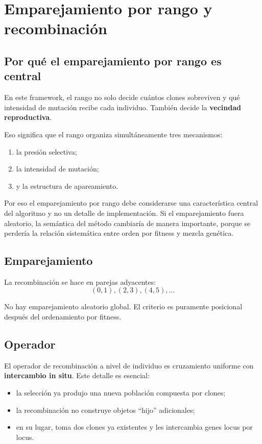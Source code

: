 \documentclass[11pt]{article}
\begin{document}
\section{Emparejamiento por rango y recombinaci\'on}

\subsection{Por qu\'e el emparejamiento por rango es central}

En este framework, el rango no solo decide cu\'antos clones sobreviven y qu\'e
intensidad de mutaci\'on recibe cada individuo. Tambi\'en decide la
\textbf{vecindad reproductiva}.

Eso significa que el rango organiza simult\'aneamente tres mecanismos:

\begin{enumerate}
  \item la presi\'on selectiva;
  \item la intensidad de mutaci\'on;
  \item y la estructura de apareamiento.
\end{enumerate}

Por eso el emparejamiento por rango debe considerarse una caracter\'istica
central del algoritmo y no un detalle de implementaci\'on. Si el emparejamiento
fuera aleatorio, la sem\'antica del m\'etodo cambiar\'ia de manera importante,
porque se perder\'ia la relaci\'on sistem\'atica entre orden por fitness y
mezcla gen\'etica.

\subsection{Emparejamiento}

La recombinaci\'on se hace en parejas adyacentes:
\[
(0,1), (2,3), (4,5), \dots
\]

No hay emparejamiento aleatorio global. El criterio es puramente posicional
despu\'es del ordenamiento por fitness.

\subsection{Operador}

El operador de recombinaci\'on a nivel de individuo es cruzamiento uniforme con
\textbf{intercambio in situ}. Este detalle es esencial:

\begin{itemize}
  \item la selecci\'on ya produjo una nueva poblaci\'on compuesta por clones;
  \item la recombinaci\'on no construye objetos ``hijo'' adicionales;
  \item en su lugar, toma dos clones ya existentes y les intercambia genes
  locus por locus.
\end{itemize}
\end{document}
